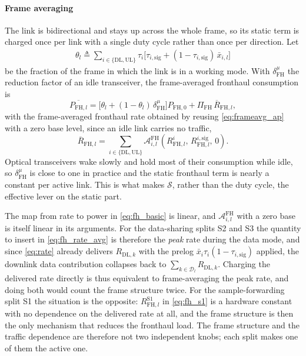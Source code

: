 \paragraph{Frame averaging}
The link is bidirectional and stays up across the whole frame, so its static term
is charged once per link with a single duty cycle rather than once per direction.
Let
\begin{align}
\label{eq:fh_duty}
\theta_{l} \triangleq \sum_{i\in\{\mathrm{DL},\mathrm{UL}\}}
\tau_{i}\Big[\tau_{i,\mathrm{sig}}
+ (1-\tau_{i,\mathrm{sig}})\,\bar x_{i,l}\Big]
\end{align}
be the fraction of the frame in which the link is in a working mode. With
$\delta^{\mu}_{\mathrm{FH}}$ the reduction factor of an idle transceiver, the
frame-averaged fronthaul consumption is
\begin{equation}
\label{eq:fh_avg}
\overline{P_{\mathrm{FH},l}} =
\Big[\theta_{l} + (1-\theta_{l})\,\delta^{\mu}_{\mathrm{FH}}\Big]
P_{\mathrm{FH},0}
+ \Pi_{\mathrm{FH}}\,\overline{R}_{\mathrm{FH},l},
\end{equation}
with the frame-averaged fronthaul rate obtained by reusing
\eqref{eq:frameavg_ap} with a zero base level, since an idle link carries no
traffic,
\begin{equation}
\label{eq:fh_rate_avg}
\overline{R}_{\mathrm{FH},l} = \sum_{i\in\{\mathrm{DL},\mathrm{UL}\}}
\mathcal{A}_{i,l}^{\mathrm{FH}}\!\left(
R^{i}_{\mathrm{FH},l},\,R^{i,\mathrm{sig}}_{\mathrm{FH},l},\,0\right).
\end{equation}
Optical transceivers wake slowly and hold most of their consumption while idle,
so $\delta^{\mu}_{\mathrm{FH}}$ is close to one in practice and the static
fronthaul term is nearly a constant per active link. This is what makes
$\mathcal{S}$, rather than the duty cycle, the effective lever on the static part.

\begin{remark}
\label{rem:no_double}
The map from rate to power in \eqref{eq:fh_basic} is linear, and
$\mathcal{A}_{i,l}^{\mathrm{FH}}$ with a zero base is itself linear in its
arguments. For the data-sharing splits S2 and S3 the quantity to insert in
\eqref{eq:fh_rate_avg} is therefore the \emph{peak} rate during the data mode,
and since \eqref{eq:rate} already delivers $R_{\mathrm{DL},k}$ with the prelog
$\bar x_{i}\tau_{i}(1-\tau_{i,\mathrm{sig}})$ applied, the downlink data
contribution collapses back to $\sum_{k\in\mathcal{D}_{l}}R_{\mathrm{DL},k}$.
Charging the delivered rate directly is thus equivalent to frame-averaging the
peak rate, and doing both would count the frame structure twice. For the
sample-forwarding split S1 the situation is the opposite: $R^{\mathrm{S1}}_{\mathrm{FH},l}$
in \eqref{eq:fh_s1} is a hardware constant with no dependence on the delivered
rate at all, and the frame structure is then the only mechanism that reduces the
fronthaul load. The frame structure and the traffic dependence are therefore not
two independent knobs; each split makes one of them the active one.
\end{remark}

